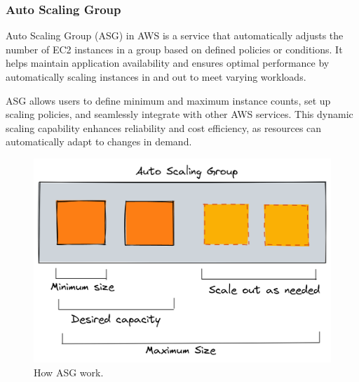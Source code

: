 \documentclass{article}
\begin{document}
\subsubsection{Auto Scaling Group}
Auto Scaling Group (ASG) in AWS is a service that automatically adjusts the number of EC2 instances in a group based on defined policies or conditions. It helps maintain application availability and ensures optimal performance by automatically scaling instances in and out to meet varying workloads.\par
ASG allows users to define minimum and maximum instance counts, set up scaling policies, and seamlessly integrate with other AWS services. This dynamic scaling capability enhances reliability and cost efficiency, as resources can automatically adapt to changes in demand.\par
\begin{figure}[h]
    \centering
    \includegraphics[width=13cm]{Pictures/Theory/AWS ASG.png}
    \caption{How ASG work.}
    \label{fig:enter-label}
\end{figure}
\newpage
\end{document}
